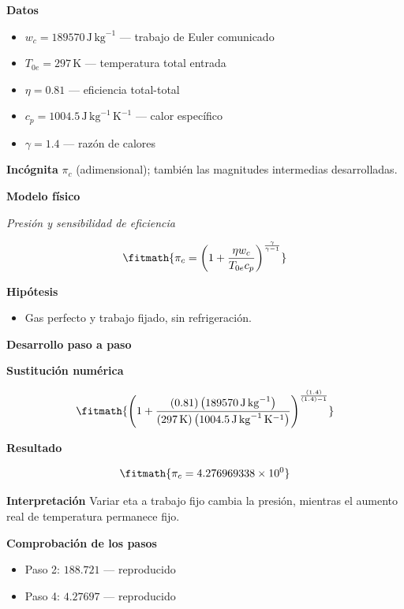 \documentclass[10pt,openany]{book}
\begin{document}
\noindent\textbf{Datos}
\begin{itemize}
\item $w_c = 189570\,\mathrm{J}\,\mathrm{kg}^{-1}$ — trabajo de Euler comunicado
\item $T_{0e} = 297\,\mathrm{K}$ — temperatura total entrada
\item $\eta = 0.81$ — eficiencia total-total
\item $c_p = 1004.5\,\mathrm{J}\,\mathrm{kg}^{-1}\,\mathrm{K}^{-1}$ — calor específico
\item $\gamma = 1.4$ — razón de calores
\end{itemize}

\noindent\textbf{Incógnita}
$\pi_c$ (adimensional); también las magnitudes intermedias desarrolladas.

\noindent\textbf{Modelo físico}

\noindent\textit{Presión y sensibilidad de eficiencia}

\[
\fitmath{\pi_c=\left(1 + \frac{\eta w_c}{T_{0e} c_p}\right)^{\frac{\gamma}{\gamma - 1}}}
\]

\noindent\textbf{Hipótesis}
\begin{itemize}
\item Gas perfecto y trabajo fijado, sin refrigeración.
\end{itemize}

\noindent\textbf{Desarrollo paso a paso}



\noindent\textbf{Sustitución numérica}

\[
\fitmath{\left(1 + \frac{\left(0.81\right) \left(189570\,\mathrm{J}\,\mathrm{kg}^{-1}\right)}{\left(297\,\mathrm{K}\right) \left(1004.5\,\mathrm{J}\,\mathrm{kg}^{-1}\,\mathrm{K}^{-1}\right)}\right)^{\frac{\left(1.4\right)}{\left(1.4\right) - 1}}}
\]

\noindent\textbf{Resultado}

\[
\fitmath{\pi_c=4.276969338\times10^{0}}
\]

\noindent\textbf{Interpretación}
Variar eta a trabajo fijo cambia la presión, mientras el aumento real de temperatura permanece fijo.

\noindent\textbf{Comprobación de los pasos}
\begin{itemize}
\item Paso 2: $188.721$ — reproducido
\item Paso 4: $4.27697$ — reproducido
\end{itemize}
\end{document}
